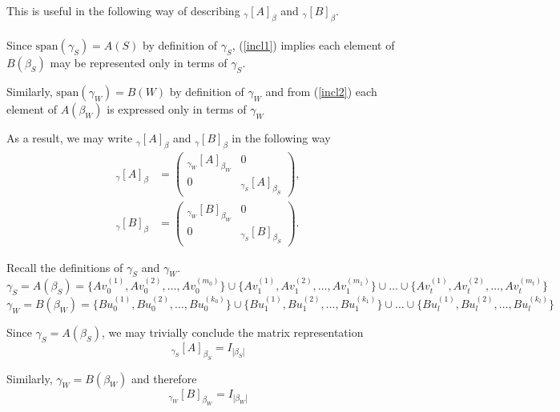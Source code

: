 This is useful in the following way of describing $_{\gamma}[A]_{\beta}$ and $_{\gamma}[B]_{\beta}$.\\ \\
Since $\text{span}(\gamma_S)=A(S)$ by definition of $\gamma_S$, (\ref{incl1}) implies each element of $B(\beta_S)$ may be represented only in terms of $\gamma_S$.

Similarly, $\text{span}(\gamma_W)=B(W)$ by definition of $\gamma_W$ and from (\ref{incl2}) each element of $A(\beta_W)$ is expressed only in terms of $\gamma_W$

As a result, we may write ${}_{\gamma}[A]_{\beta}$ and ${}_{\gamma}[B]_{\beta}$ in the following way
\begin{equation}\label{begginingoftheend}
    \begin{aligned}
{}_{\gamma}[A]_{\beta}
&=
\begin{pmatrix}
_{\gamma_W}[A]_{\beta_W} & 0\\
0 & _{\gamma_S}[A]_{\beta_S}
\end{pmatrix},
\\[1em]
{}_{\gamma}[B]_{\beta}
&=
\begin{pmatrix}
_{\gamma_W}[B]_{\beta_W} & 0\\
0 & _{\gamma_S}[B]_{\beta_S}
\end{pmatrix}.
\end{aligned}
\end{equation}


Recall the definitions of $\gamma_S$ and $\gamma_W$.
\begin{equation*}
\gamma_S=A(\beta_S)=\{Av_{0}^{(1)},Av_{0}^{(2)},\dots,Av_{0}^{(m_0)}\} \cup \{Av_{1}^{(1)},Av_{1}^{(2)},\dots,Av_{1}^{(m_1)}\} \cup \dots \cup \{Av_{t}^{(1)},Av_{t}^{(2)},\dots,Av_{t}^{(m_t)}\}
 \end{equation*}
 \begin{equation*}
\gamma_W=B(\beta_W)=\{Bu_{0}^{(1)},Bu_{0}^{(2)},\dots,Bu_{0}^{(k_0)}\} \cup \{Bu_{1}^{(1)},Bu_{1}^{(2)},\dots,Bu_{1}^{(k_1)}\} \cup \dots \cup \{Bu_{l}^{(1)},Bu_{l}^{(2)},\dots,Bu_{l}^{(k_l)}\}
 \end{equation*}

Since $\gamma_S=A(\beta_S)$, we may trivially conclude the matrix representation
\begin{equation}\label{!1}
{}_{\gamma_S}[A]_{\beta_S}=I_{|\beta_S|}
\end{equation}


Similarly, $\gamma_W=B(\beta_W)$ and therefore
\begin{equation}\label{!2}
_{\gamma_W}[B]_{\beta_W}=I_{|\beta_W|}
\end{equation}


